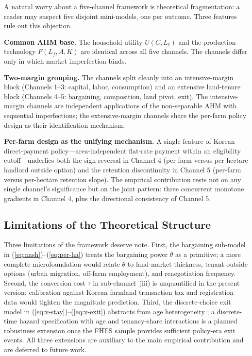 A natural worry about a five-channel framework is theoretical fragmentation: a reader may suspect five disjoint mini-models, one per outcome. Three features rule out this objection.

\textbf{Common AHM base.} The household utility $U(C, L_\ell)$ and the production technology $F(L_f, A, K)$ are identical across all five channels. The channels differ only in which market imperfection binds.

\textbf{Two-margin grouping.} The channels split cleanly into an intensive-margin block (Channels 1--3: capital, labor, consumption) and an extensive land-tenure block (Channels 4--5: bargaining, composition, land pivot, exit). The intensive-margin channels are independent applications of the non-separable AHM with sequential imperfections; the extensive-margin channels share the per-farm policy design as their identification mechanism.

\textbf{Per-farm design as the unifying mechanism.} A single feature of Korean direct-payment policy---area-independent flat-rate payment within an eligibility cutoff---underlies both the sign-reversal in Channel 4 (per-farm versus per-hectare landlord outside option) and the retention discontinuity in Channel 5 (per-farm versus per-hectare retention slope). The empirical contribution rests not on any single channel's significance but on the joint pattern: three concurrent monotone gradients in Channel 4, plus the directional consistency of Channel 5.

\subsection{Limitations of the Theoretical Structure}
\label{sec:theory-limits}

Three limitations of the framework deserve note. First, the bargaining sub-model in (\ref{eq:nash})--(\ref{eq:per-ha}) treats the bargaining power $\theta$ as a primitive; a more complete microfoundation would relate $\theta$ to land-market thickness, tenant outside options (urban migration, off-farm employment), and renegotiation frequency. Second, the conversion cost $\tau$ in sub-channel~(iii) is unquantified in the present version; calibration against Korean farmland transaction tax and registration data would tighten the magnitude prediction. Third, the discrete-choice exit model in (\ref{eq:v-stay})--(\ref{eq:v-exit}) abstracts from age heterogeneity \citep{Kimhi2000_exit}; a discrete-time hazard specification with age and tenancy-share interactions is a planned robustness extension once the FHES sample provides sufficient policy-era exit events. All three extensions are auxiliary to the main empirical contribution and are deferred to future work.

